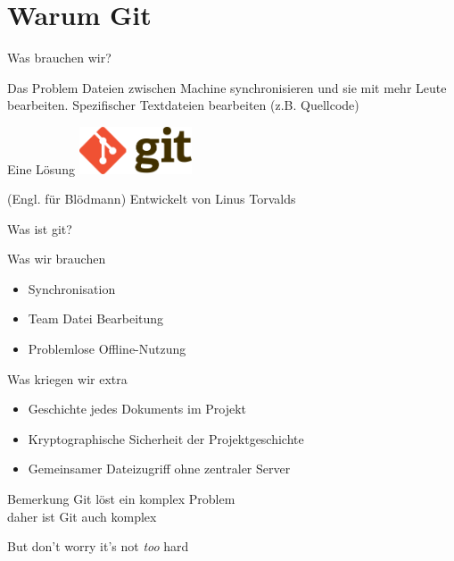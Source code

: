 \section{Warum Git}

\begin{frame}{Was brauchen wir?}
	\begin{block}{Das Problem}
		Dateien zwischen Machine synchronisieren und sie mit mehr Leute
		bearbeiten. Spezifischer Textdateien bearbeiten (z.B. Quellcode)
	\end{block}
	\pause

	\begin{block}{Eine L\"osung}
	\centering
	\vspace{1em}
	\includegraphics[width=0.25\textwidth]{pic/git.png}\\
	\vspace{1em}

	(Engl. f\"ur Bl\"odmann) Entwickelt von Linus Torvalds
	\end{block}
\end{frame}

\begin{frame}{Was ist git?}
	\begin{block}{Was wir brauchen}
	\begin{itemize}
		\item Synchronisation
		\item Team Datei Bearbeitung
		\item Problemlose Offline-Nutzung
	\end{itemize}
	\end{block}
	\pause

	\begin{block}{Was kriegen wir extra}
	\begin{itemize}
		\item Geschichte jedes Dokuments im Projekt
		\item Kryptographische Sicherheit der Projektgeschichte
		\item Gemeinsamer Dateizugriff ohne zentraler Server 
	\end{itemize}
	\end{block}
\end{frame}

\begin{frame}[c]{Bemerkung}
	\centering
	{\LARGE 
	Git l\"ost ein komplex Problem \\
	daher ist Git auch komplex
	}

	{\footnotesize
		But don't worry it's not \emph{too} hard
	}
\end{frame}

